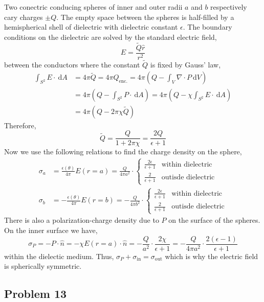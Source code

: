 \documentclass[12pt]{extarticle}
\renewcommand{\d}[1]{\: \mathrm{d}#1}
\theoremstyle{definition}
\begin{document}
Two conectric conducing spheres of inner and outer radii $a$ and $b$ respectively cary charges $\pm Q$. The empty space between the spheres is half-filled by a hemispherical shell of dielectric with dielectric constant $\epsilon$. The boundary conditions on the dielectric are solved by the standard electric field,
\[ E = \frac{\tilde{Q} \hat{r}}{r^2} \]
between the conductors where the constant $\tilde{Q}$ is fixed by Gauss' law,
\begin{align*}
\int_{S^2} E \cdot \d{A} & = 4 \pi \tilde{Q} = 4 \pi Q_{\text{enc.}} = 4 \pi \left( Q - \int_{V} \nabla \cdot P \d{V} \right)
\\
& = 4 \pi \left( Q - \int_{S^2} P \cdot \d{A} \right) = 4 \pi \left( Q - \chi \int_{S^2} E \cdot \d{A} \right)
\\
& = 4 \pi \left( Q - 2 \pi \chi \tilde{Q} \right)
\end{align*}
Therefore,
\[ \tilde{Q} = \frac{Q}{1 + 2 \pi \chi} = \frac{2 Q}{\epsilon + 1} \]
Now we use the following relations to find the charge density on the sphere,
\begin{align*}
\sigma_a & = \frac{\epsilon(\theta)}{4 \pi} E(r = a) = \frac{Q}{4 \pi a^2} \cdot
\begin{cases}
\frac{2 \epsilon}{\epsilon + 1} & \text{within dielectric}
\\
\frac{2}{\epsilon + 1} & \text{outisde dielectric}
\end{cases}
\\
\sigma_b & = -\frac{\epsilon(\theta)}{4 \pi} E(r = b) = -\frac{Q}{4 \pi b^2} \cdot
\begin{cases}
\frac{2 \epsilon}{\epsilon + 1} & \text{within dielectric}
\\
\frac{2}{\epsilon + 1} & \text{outisde dielectric}
\end{cases}
\end{align*}
There is also a polarization-charge density due to $P$ on the surface of the spheres. On the inner surface we have,
\[ \sigma_{P} = -P \cdot \hat{n} = -\chi E(r = a) \cdot \hat{n} = - \frac{Q}{a^2} \cdot \frac{2 \chi}{\epsilon + 1} = - \frac{Q}{4 \pi a^2} \cdot \frac{2(\epsilon - 1)}{\epsilon + 1} \]
within the dielectic medium. Thus, $\sigma_P + \sigma_{\text{in}} = \sigma_{\text{out}}$ which is why the electric field is spherically symmetric. 


\subsection{Problem 13}
\end{document}
